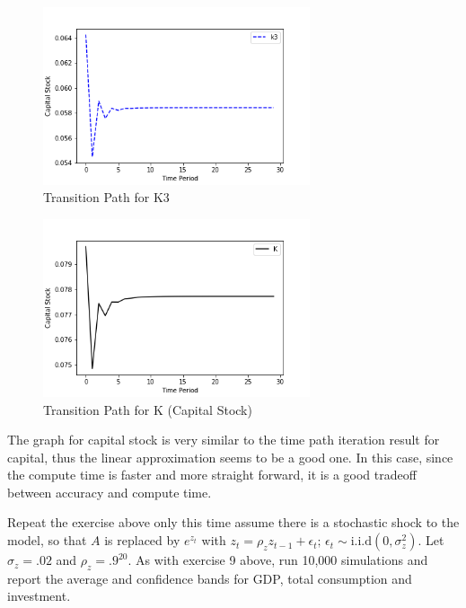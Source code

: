 \documentclass[letterpaper,11pt]{article}
\theoremstyle{definition}
\begin{document}
\begin{spacing}{1.5}
	\begin{figure}[H]
		\caption{Transition Path for K3}
		\label{fig:k3_tpi}
		\includegraphics[width=0.7\textwidth]{k3TPI.png}
	\end{figure}

	\begin{figure}[H]
		\caption{Transition Path for K (Capital Stock)}
		\label{fig:K_tpi}
		\includegraphics[width=0.7\textwidth]{KTPI.png}
	\end{figure}

	The graph for capital stock is very similar to the time path iteration result for capital, thus the linear approximation seems to be a good one. In this case, since the compute time is faster and more straight forward, it is a good tradeoff between accuracy and compute time.

	\begin{Exercise} \label{Linear_HW_OLG_Stoch}
		Repeat the exercise above only this time assume there is a stochastic shock to the model, so that $A$ is replaced by $e^{z_t}$ with $z_t = \rho_z z_{t-1} + \epsilon_t;\,\epsilon_t \sim \text{i.i.d} (0,\sigma_z^2)$.  Let $\sigma_z=.02$ and $\rho_z=.9^{20}$.  As with exercise 9 above, run 10,000 simulations and report the average and confidence bands for GDP, total consumption and investment.
	\end{Exercise}


\end{spacing}
\end{document}
